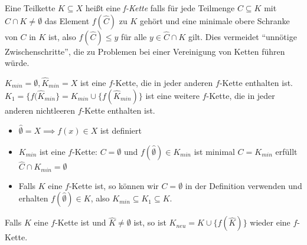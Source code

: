 \begin{definition}
	Eine Teilkette $K \subseteq X$ heißt eine \emph{f-Kette} falls für jede Teilmenge $C \subseteq K$ mit $\widehat{C} \cap K \neq \emptyset$ das Element
	$f(\widehat{C})$ zu $K$ gehört und eine minimale obere Schranke von $C$ in $K$ ist, also $f(\widehat{C}) \leq y$ für alle $y \in \widehat{C} \cap K$ gilt.
	Dies vermeidet \enquote{unnötige Zwischenschritte}, die zu Problemen bei einer Vereinigung von Ketten führen würde.
\end{definition}

\begin{eg}
	$K_{min} = \emptyset, \widehat{K}_{min} = X$ ist eine $f$-Kette, die in jeder anderen $f$-Kette enthalten ist.\\
	$K_1 = \{f(\widehat{K}_{min}\} = K_{min} \cup \{f(\widehat{K}_{min})\}$ ist eine weitere $f$-Kette, die in jeder anderen nichtleeren $f$-Kette enthalten ist.
	\begin{itemize}
		\item $\widehat{\emptyset} = X \implies f(x) \in X$ ist definiert
		\item $K_{min}$ ist eine $f$-Kette: $C=\emptyset$ und $f(\widehat{\emptyset}) \in K_{min}$ ist minimal $C=K_{min}$ erfüllt $\widehat{C} \cap K_{min} = \emptyset$
		\item Falls $K$ eine $f$-Kette ist, so können wir $C=\emptyset$ in der Definition verwenden und erhalten $f(\widehat{\emptyset}) \in K$, also $K_{min} \subseteq K_1 \subseteq K$.
	\end{itemize}
\end{eg}

\begin{lemma}[Verlängerung]
	Falls $K$ eine $f$-Kette ist und $\widehat{K} \neq \emptyset$ ist, so ist $K_{neu} = K \cup \{f(\widehat{K})\} $ wieder eine $f$-Kette.
\end{lemma}

